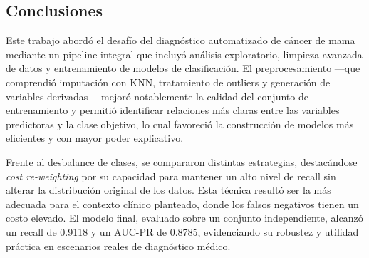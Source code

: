 \begin{multicols}{2}
\section{Conclusiones}

Este trabajo abordó el desafío del diagnóstico automatizado de cáncer de mama mediante un pipeline integral que incluyó análisis exploratorio, limpieza avanzada de datos y entrenamiento de modelos de clasificación. El preprocesamiento —que comprendió imputación con KNN, tratamiento de outliers y generación de variables derivadas— mejoró notablemente la calidad del conjunto de entrenamiento y permitió identificar relaciones más claras entre las variables predictoras y la clase objetivo, lo cual favoreció la construcción de modelos más eficientes y con mayor poder explicativo.

Frente al desbalance de clases, se compararon distintas estrategias, destacándose \textit{cost re-weighting} por su capacidad para mantener un alto nivel de recall sin alterar la distribución original de los datos. Esta técnica resultó ser la más adecuada para el contexto clínico planteado, donde los falsos negativos tienen un costo elevado. El modelo final, evaluado sobre un conjunto independiente, alcanzó un recall de 0.9118 y un AUC-PR de 0.8785, evidenciando su robustez y utilidad práctica en escenarios reales de diagnóstico médico.


\end{multicols}






